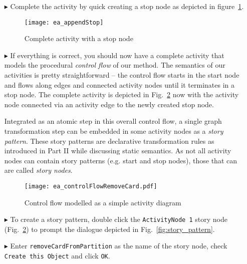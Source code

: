 \begin{itemize}
\item[$\blacktriangleright$] Complete the activity by quick creating a stop node as depicted in figure~\ref{fig:sdm_stop_node}.

\begin{figure}[htp]
\begin{center}
  \texttt{[image: ea\_appendStop]}
  \caption{Complete activity with a stop node}  
  \label{fig:sdm_stop_node}
\end{center}
\end{figure}

\item[$\blacktriangleright$] If everything is correct, you should now have a complete activity that models the procedural \emph{control flow} of our method. 
The semantics of our activities is pretty straightforward -- the control flow starts in the start node and flows along edges and connected activity nodes until
it terminates in a stop node.  The complete activity is depicted in Fig.~\ref{fig:sdm_complete_control_flow_simple} now with the activity node connected via
an activity edge to the newly created stop node.

\label{story-pattern}
Integrated as an atomic step in this overall control flow, a single graph  transformation step can be embedded in some activity nodes as a
\emph{story pattern}.  These story patterns are declarative transformation rules as introduced in Part II while discussing static semantics.  As not all 
activity nodes can contain story patterns (e.g. start and stop nodes), those that can are called \emph{story nodes}.

\begin{figure}[htp]
\begin{center}
  \texttt{[image: ea\_controlFlowRemoveCard.pdf]}
  \caption{Control flow modelled as a simple activity diagram}  
  \label{fig:sdm_complete_control_flow_simple}
\end{center}
\end{figure}

\item[$\blacktriangleright$] To create a story pattern, double click the \texttt{ActivityNode 1} story node (Fig.~\ref{fig:sdm_complete_control_flow_simple}) to
prompt the dialogue depicted in Fig.~\ref{fig:story_pattern}.

\item[$\blacktriangleright$] Enter \texttt{remove\-Card\-From\-Partition} as the name of the story node, check \texttt{Create this Object} and click
\texttt{OK}.


\end{itemize}
